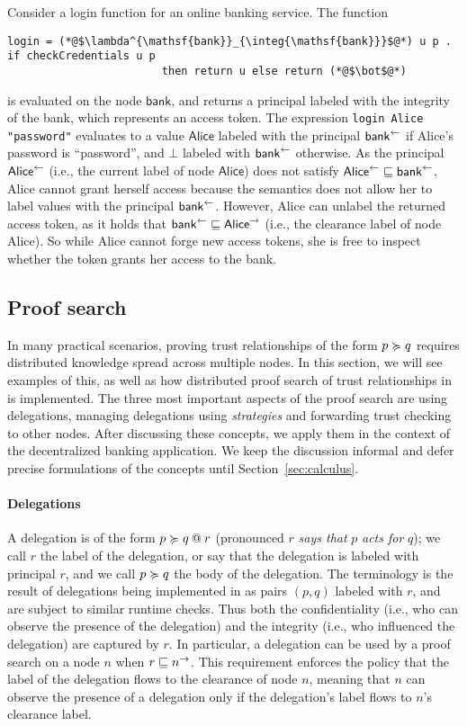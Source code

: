 Consider a login function for an online banking service. The function
\begin{lstlisting}
login = (*@$\lambda^{\mathsf{bank}}_{\integ{\mathsf{bank}}}$@*) u p . if checkCredentials u p
                        then return u else return (*@$\bot$@*)
\end{lstlisting}
is evaluated on the node $\mathsf{bank}$, and returns a principal labeled with the integrity of the bank, which represents an access token. The expression \lstinline[mathescape]!login Alice "password"! evaluates to a value $\mathsf{Alice}$ labeled with the principal $\integ{\mathsf{bank}}$ if Alice's password is ``password'', and $\bot$ labeled with $\integ{\mathsf{bank}}$ otherwise. As the principal $\integ{\mathsf{Alice}}$ (i.e., the current label of node $\mathsf{Alice}$) does not satisfy $\integ{\mathsf{Alice}} \flowsto \integ{\mathsf{bank}}$, Alice cannot grant herself access because the semantics does not allow her to label values with the principal $\integ{\mathsf{bank}}$.
However, Alice can unlabel the returned access token, as it holds that $\integ{\mathsf{bank}} \flowsto \conf{\mathsf{Alice}}$ (i.e., the clearance label of node Alice). So while Alice cannot forge new access tokens, she is free to inspect whether the token grants her access to the bank.

\subsection{Proof search}
In many practical scenarios, proving trust relationships of the form $p \actsfor q$ requires distributed knowledge spread across multiple nodes. In this section, we will see examples of this, as well as how distributed proof search of trust relationships in \lang{} is implemented. The three most important aspects of the proof search are using delegations, managing delegations using \emph{strategies} and forwarding trust checking to other nodes. After discussing these concepts, we apply them in the context of the decentralized banking application. We keep the discussion informal and defer precise formulations of the concepts until Section~\ref{sec:calculus}.

\paragraph{Delegations}
A delegation is of the form $\lb{r}{p \actsfor q}$ (pronounced $r$ \emph{says that} $p$ \emph{acts for} $q$); we call $r$ the label of the delegation, or say that the delegation is labeled with principal $r$, and we call $p \actsfor q$ the body of the delegation. The terminology is the result of delegations being implemented in {\lang} as pairs $(p, q)$ labeled with $r$, and are subject to similar runtime checks. Thus both the confidentiality (i.e., who can observe the presence of the delegation) and the integrity (i.e., who influenced the delegation) are captured by $r$. In particular, a delegation can be used by a proof search on a node $n$ when $r \flowsto \conf{n}$. This requirement enforces the policy that the label of the delegation flows to the clearance of node $n$, meaning that $n$ can observe the presence of a delegation only if the delegation's label flows to $n$'s clearance label.

